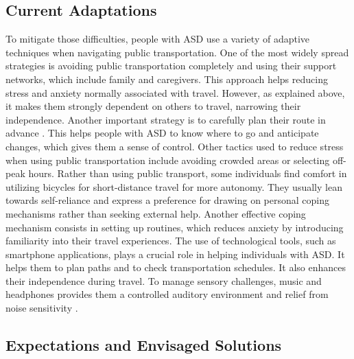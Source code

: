 \subsection{Current Adaptations}

   To mitigate those difficulties, people with ASD use a variety of adaptive techniques when navigating public transportation. 
   \newline
   \newline
   One of the most widely spread strategies is avoiding public transportation completely and using their support networks, which include family and caregivers\cite{deka_co-principal_nodate}. This approach helps reducing stress and anxiety normally associated with travel. However, as explained above, it makes them strongly dependent on others to travel, narrowing their independence. 
   \newline
   \newline
    Another important strategy is to carefully plan their route in advance \cite{haas_experiences_nodate}. This helps people with ASD to know where to go and anticipate changes, which gives them a sense of control. Other tactics used to reduce stress when using public transportation include avoiding crowded areas or selecting off-peak hours.
\newline
\newline
   Rather than using public transport, some individuals find comfort in utilizing bicycles for short-distance travel \cite{falkmer_viewpoints_2015} for more autonomy. They usually lean towards self-reliance and express a preference for drawing on personal coping mechanisms rather than seeking external help. Another effective coping mechanism consists in setting up routines\cite{falkmer_viewpoints_2015}, which reduces anxiety by introducing familiarity into their travel experiences. 
   \newline
   \newline
   The use of technological tools, such as smartphone applications, plays a crucial role in helping individuals with ASD. It helps them to plan paths and to check transportation schedules. It also enhances their independence during travel. To manage sensory challenges, music and headphones provides them a controlled auditory environment and relief from noise sensitivity \cite{haas_experiences_nodate}. 


\subsection{Expectations and Envisaged Solutions}

